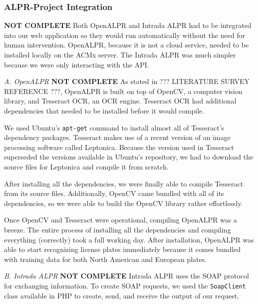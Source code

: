 \documentclass[11pt, oneside, fullpage, doublespace]{article}
\begin{document}
\subsubsection{ALPR-Project Integration}
{\color{red}\textbf{NOT COMPLETE}}
Both OpenALPR and Intrada ALPR had to be integrated into our web application so they would run automatically without the need for human intervention. OpenALPR, because it is not a cloud service, needed to be installed locally on the ACMx server. The Intrada ALPR was much simpler because we were only interacting with the API.

\emph{A. OpenALPR}
{\color{red}\textbf{NOT COMPLETE}}
As stated in ??? LITERATURE SURVEY REFERENCE ???, OpenALPR is built on top of OpenCV, a computer vision library, and Tesseract OCR, an OCR engine. Tesseract OCR had additional dependencies that needed to be installed before it would compile.

We used Ubuntu's \verb+apt-get+ command to install almost all of Tesseract's dependency packages. Tesseract makes use of a recent version of an image processing software called Leptonica. Because the version used in Tesseract superseded the versions available in Ubuntu's repository, we had to download the source files for Leptonica and compile it from scratch.

After installing all the dependencies, we were finally able to compile Tesseract from its source files. Additionally, OpenCV came bundled with all of its dependencies, so we were able to build the OpenCV library rather effortlessly.

Once OpenCV and Tesseract were operational, compiling OpenALPR was a breeze. The entire process of installing all the dependencies and compiling everything (correctly) took a full working day. After installation, OpenALPR was able to start recognizing license plates immediately because it comes bundled with training data for both North American and European plates.

\emph{B. Intrada ALPR}
{\color{red}\textbf{NOT COMPLETE}}
Intrada ALPR uses the SOAP protocol for exchanging information. To create SOAP requests, we used the \verb+SoapClient+ class available in PHP to create, send, and receive the output of our request.
\end{document}
